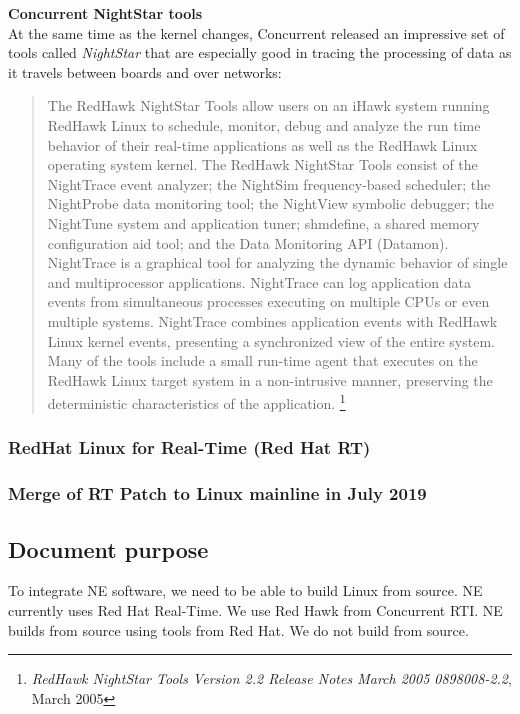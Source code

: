 \documentclass[12pt]{article}
\begin{document}
\textbf{Concurrent NightStar tools}\\
At the same time as the kernel changes, Concurrent released an impressive set of
tools called \emph{NightStar} that are especially good in tracing the processing
of data as it travels between boards and over networks:

\begin{quote}
The RedHawk NightStar Tools allow users on an iHawk system running
RedHawk Linux to schedule, monitor, debug and analyze the run time behavior of
their real-time applications as well as the RedHawk Linux operating system
kernel.  The RedHawk NightStar Tools consist of the NightTrace event analyzer;
the NightSim frequency-based scheduler; the NightProbe data monitoring tool; the
NightView symbolic debugger; the NightTune system and application tuner;
shmdefine, a shared memory configuration aid tool; and the Data Monitoring API
(Datamon).  NightTrace is a graphical tool for analyzing the dynamic behavior of
single and multiprocessor applications. NightTrace can log application data
events from simultaneous processes executing on multiple CPUs or even multiple
systems. NightTrace combines application events with RedHawk Linux kernel
events, presenting a synchronized view of the entire system.  Many of the tools
include a small run-time agent that executes on the RedHawk Linux target system
in a non-intrusive manner, preserving the deterministic characteristics of the
application.%
\footnote{\emph{RedHawk NightStar Tools Version 2.2 Release Notes March 2005
0898008-2.2}, March 2005}
\end{quote}


\subsubsection{RedHat Linux for Real-Time (Red Hat RT)}


\subsubsection{Merge of RT Patch to Linux mainline in July 2019}

\subsection{Document purpose}
To integrate NE software, we need to be able to build Linux from source.  NE
currently uses Red Hat Real-Time.  We use Red Hawk from Concurrent RTI.  NE
builds from source using tools from Red Hat.  We do not build from source.
\end{document}
